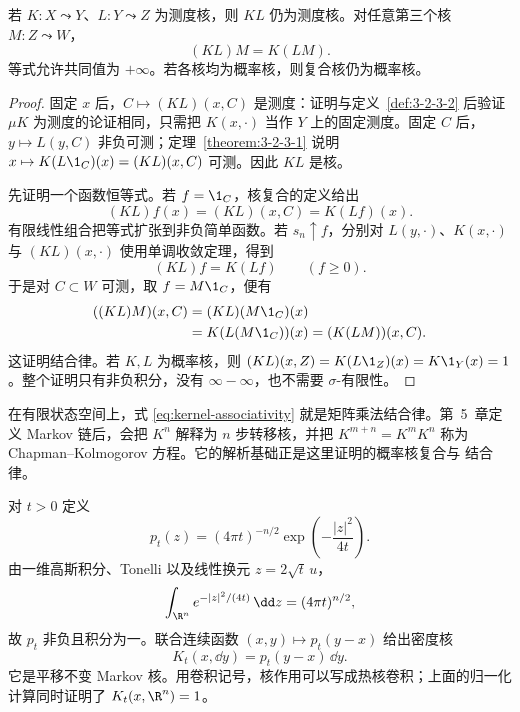 \begin{proposition}[核复合与结合律]\label{proposition:3-2-3-2}
若 $K:X\leadsto Y$、$L:Y\leadsto Z$ 为测度核，则 $KL$ 仍为测度核。对任意第三个核
$M:Z\leadsto W$，
\[
 (KL)M=K(LM).
 \tag{3.2.18}\label{eq:kernel-associativity}
\]
等式允许共同值为 $+\infty$。若各核均为概率核，则复合核仍为概率核。
\end{proposition}

\begin{proof}
固定 $x$ 后，$C\mapsto(KL)(x,C)$ 是测度：证明与定义~\ref{def:3-2-3-2} 后验证
$\mu K$ 为测度的论证相同，只需把 $K(x,\cdot)$ 当作 $Y$ 上的固定测度。固定 $C$ 后，
$y\mapsto L(y,C)$ 非负可测；定理~\ref{theorem:3-2-3-1} 说明
$x\mapsto K(L\1_C)(x)=(KL)(x,C)$ 可测。因此 $KL$ 是核。

先证明一个函数恒等式。若 $f=\1_C$，核复合的定义给出
\[
 (KL)f(x)=(KL)(x,C)=K(Lf)(x).
\]
有限线性组合把等式扩张到非负简单函数。若 $s_n\uparrow f$，分别对
$L(y,\cdot)$、$K(x,\cdot)$ 与 $(KL)(x,\cdot)$ 使用单调收敛定理，得到
\[
 (KL)f=K(Lf)\qquad(f\ge0).
 \tag{3.2.19}\label{eq:kernel-function-assoc}
\]
于是对 $C\subset W$ 可测，取 $f=M\1_C$，便有
\[
 \begin{aligned}
 ((KL)M)(x,C)
 &=(KL)(M\1_C)(x)\\
 &=K(L(M\1_C))(x)
 =(K(LM))(x,C).
 \end{aligned}
\]
这证明结合律。若 $K,L$ 为概率核，则
$(KL)(x,Z)=K(L\1_Z)(x)=K\1_Y(x)=1$。整个证明只有非负积分，没有
$\infty-\infty$，也不需要 $\sigma$-有限性。
\end{proof}

在有限状态空间上，式 \eqref{eq:kernel-associativity} 就是矩阵乘法结合律。第~5~章定义
Markov 链后，会把 $K^n$ 解释为 $n$ 步转移核，并把
$K^{m+n}=K^mK^n$ 称为 Chapman--Kolmogorov 方程。它的解析基础正是这里证明的概率核复合与
结合律。

\begin{example}[热核的平移密度]\label{ex:3-2-3-3}
对 $t>0$ 定义
\[
 p_t(z)=(4\pi t)^{-n/2}\exp\!\left(-\frac{|z|^2}{4t}\right).
\]
由一维高斯积分、Tonelli 以及线性换元 $z=2\sqrt t\,u$，
\[
 \int_{\R^n}e^{-|z|^2/(4t)}\,\dd z=(4\pi t)^{n/2},
\]
故 $p_t$ 非负且积分为一。联合连续函数 $(x,y)\mapsto p_t(y-x)$ 给出密度核
\[
 K_t(x,\dd y)=p_t(y-x)\,\dd y.
\]
它是平移不变 Markov 核。用卷积记号，核作用可以写成热核卷积；上面的归一化计算同时证明了
$K_t(x,\R^n)=1$。
\end{example}


